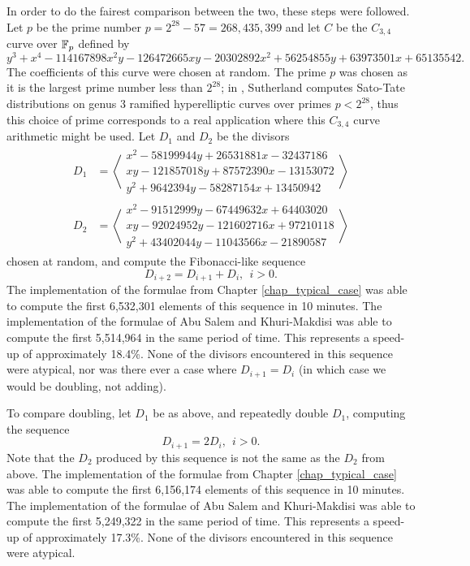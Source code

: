 In order to do the fairest comparison between the two, these steps were followed.
Let $p$ be the prime number $p = 2^{28} - 57 = 268,435,399$
and let $C$ be the $C_{3,4}$ curve over $\mathbb{F}_p$ defined by
 \[y^3 + x^4 - 114167898x^2y - 126472665xy - 20302892x^2 + 56254855y + 63973501x + 65135542.\]
The coefficients of this curve were chosen at random.
The prime $p$ was chosen as it is the largest prime number less than $2^{28}$;
in \cite{sutherland16}, Sutherland computes Sato-Tate distributions
on genus 3 ramified hyperelliptic curves over primes $p < 2^{28}$,
thus this choice of prime corresponds to a real application where this $C_{3,4}$ curve arithmetic might be used.
Let $D_1$ and $D_2$ be the divisors
\begin{align*}
  D_1 &= \left\langle \begin{array}{r}
    x^2 -  58199944y + 26531881x - 32437186 \\
     xy - 121857018y + 87572390x - 13153072 \\
    y^2 +   9642394y - 58287154x + 13450942
  \end{array} \right\rangle \\
  D_2 &= \left\langle \begin{array}{r}
    x^2 - 91512999y -  67449632x + 64403020 \\
     xy - 92024952y - 121602716x + 97210118 \\
    y^2 + 43402044y - 11043566x  - 21890587
  \end{array} \right\rangle
\end{align*}
chosen at random, and compute the Fibonacci-like sequence 
  \[ D_{i+2} = D_{i+1} + D_i, ~~ i > 0. \]
The implementation of the formulae from Chapter \ref{chap_typical_case} was able to compute
the first 6,532,301 elements of this sequence in 10 minutes.
The implementation of the formulae of Abu Salem and Khuri-Makdisi was able to compute
the first 5,514,964 in the same period of time.
This represents a speed-up of approximately 18.4\%.
None of the divisors encountered in this sequence were atypical,
nor was there ever a case where $D_{i+1} = D_{i}$
(in which case we would be doubling, not adding).

To compare doubling, let $D_1$ be as above,
and repeatedly double $D_1$, computing the sequence
  \[ D_{i+1} = 2D_i, ~~ i > 0. \]
Note that the $D_2$ produced by this sequence is not the same as the $D_2$ from above.
The implementation of the formulae from Chapter \ref{chap_typical_case} was able to compute
the first 6,156,174 elements of this sequence in 10 minutes.
The implementation of the formulae of Abu Salem and Khuri-Makdisi was able to compute
the first 5,249,322 in the same period of time.
This represents a speed-up of approximately 17.3\%.
None of the divisors encountered in this sequence were atypical.

